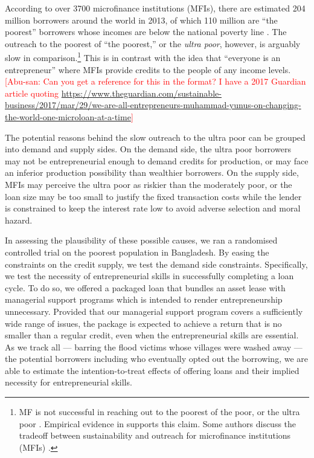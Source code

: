 	According to over 3700 microfinance institutions (MFIs), there are estimated 204 million borrowers around the world in 2013, of which 110 million are ``the poorest'' borrowers whose incomes are below the national poverty line \citep{MFGateway2015}. The outreach to the poorest of ``the poorest,'' or the \textit{ultra poor}, however, is arguably slow in comparison.\footnote{MF is not successful in reaching out to the poorest of the poor, or the ultra poor \citep[][]{Scully2004}. Empirical evidence in \citet{Yaron1994, Navajas2000, RahmanRazzaque2000, AghionMorduch2007} supports this claim. Some authors discuss the tradeoff between sustainability and outreach for microfinance institutions (MFIs) \citet{HermesLensink2011, HermesLensinkMeesters2011, Cull2011}. } This is in contrast with the idea that ``everyone is an entrepreneur'' where MFIs provide credits to the people of any income levels.\textcolor{red}{[Abu-san: Can you get a reference for this in the \BibTeX format? I have a 2017 Guardian article quoting \href{we are all entrepreneurs}{https://www.theguardian.com/sustainable-business/2017/mar/29/we-are-all-entrepreneurs-muhammad-yunus-on-changing-the-world-one-microloan-at-a-time}]}

	The potential reasons behind the slow outreach to the ultra poor can be grouped into demand and supply sides. On the demand side, the ultra poor borrowers may not be entrepreneurial enough to demand credits for production, or may face an inferior production possibility than wealthier borrowers. On the supply side, MFIs may perceive the ultra poor as riskier than the moderately poor, or the loan size may be too small to justify the fixed transaction costs while the lender is constrained to keep the interest rate low to avoid adverse selection and moral hazard. 

	In assessing the plausibility of these possible causes, we ran a randomised controlled trial on the poorest population in Bangladesh. By easing the constraints on the credit supply, we test the demand side constraints. Specifically, we test the necessity of entrepreneurial skills in successfully completing a loan cycle. To do so, we offered a packaged loan that bundles an asset lease with managerial support programs which is intended to render entrepreneurship unnecessary. Provided that our managerial support program covers a sufficiently wide range of issues, the package is expected to achieve a return that is no smaller than a regular credit, even when the entrepreneurial skills are essential. As we track all --- barring the flood victims whose villages were washed away --- the potential borrowers including who eventually opted out the borrowing, we are able to estimate the intention-to-treat effects of offering loans and their implied necessity for entrepreneurial skills. 
	
